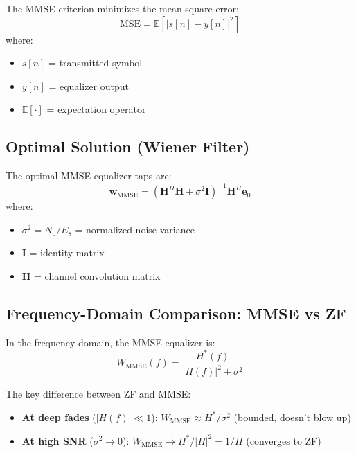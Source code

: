 The MMSE criterion minimizes the mean square error:
\begin{equation}
\text{MSE} = \mathbb{E}[|s[n] - y[n]|^2]
\label{eq:mmse-cost}
\end{equation}
where:
\begin{itemize}
\item $s[n]$ = transmitted symbol
\item $y[n]$ = equalizer output
\item $\mathbb{E}[\cdot]$ = expectation operator
\end{itemize}

\subsection{Optimal Solution (Wiener Filter)}

The optimal MMSE equalizer taps are:
\begin{equation}
\mathbf{w}_{\text{MMSE}} = (\mathbf{H}^H \mathbf{H} + \sigma^2 \mathbf{I})^{-1} \mathbf{H}^H \mathbf{e}_0
\label{eq:mmse-taps}
\end{equation}
where:
\begin{itemize}
\item $\sigma^2 = N_0/E_s$ = normalized noise variance
\item $\mathbf{I}$ = identity matrix
\item $\mathbf{H}$ = channel convolution matrix
\end{itemize}

\subsection{Frequency-Domain Comparison: MMSE vs ZF}

In the frequency domain, the MMSE equalizer is:
\begin{equation}
W_{\text{MMSE}}(f) = \frac{H^*(f)}{|H(f)|^2 + \sigma^2}
\label{eq:mmse-freq}
\end{equation}

\begin{keyconcept}
The key difference between ZF and MMSE:
\begin{itemize}
\item \textbf{At deep fades} ($|H(f)| \ll 1$): $W_{\text{MMSE}} \approx H^*/\sigma^2$ (bounded, doesn't blow up)
\item \textbf{At high SNR} ($\sigma^2 \to 0$): $W_{\text{MMSE}} \to H^*/|H|^2 = 1/H$ (converges to ZF)
\end{itemize}
\end{keyconcept}

